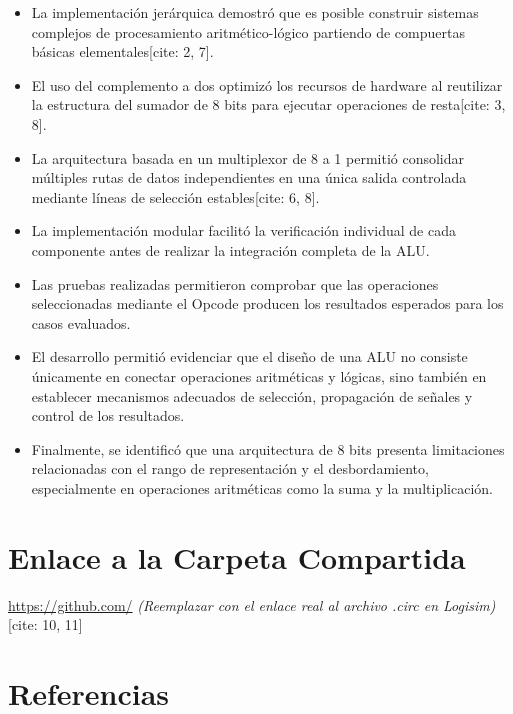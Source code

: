 \documentclass[12pt,a4paper]{article}
\begin{document}
\begin{itemize}
    \item La implementación jerárquica demostró que es posible construir sistemas complejos de procesamiento aritmético-lógico partiendo de compuertas básicas elementales[cite: 2, 7].
    
    \item El uso del complemento a dos optimizó los recursos de hardware al reutilizar la estructura del sumador de 8 bits para ejecutar operaciones de resta[cite: 3, 8].
    
    \item La arquitectura basada en un multiplexor de 8 a 1 permitió consolidar múltiples rutas de datos independientes en una única salida controlada mediante líneas de selección estables[cite: 6, 8].
    
    \item La implementación modular facilitó la verificación individual de cada componente antes de realizar la integración completa de la ALU.
    
    \item Las pruebas realizadas permitieron comprobar que las operaciones seleccionadas mediante el Opcode producen los resultados esperados para los casos evaluados.
    
    \item El desarrollo permitió evidenciar que el diseño de una ALU no consiste únicamente en conectar operaciones aritméticas y lógicas, sino también en establecer mecanismos adecuados de selección, propagación de señales y control de los resultados.
    
    \item Finalmente, se identificó que una arquitectura de 8 bits presenta limitaciones relacionadas con el rango de representación y el desbordamiento, especialmente en operaciones aritméticas como la suma y la multiplicación.
\end{itemize}

\section{Enlace a la Carpeta Compartida}

\url{https://github.com/} \textit{(Reemplazar con el enlace real al archivo .circ en Logisim)}[cite: 10, 11]

\section{Referencias}
\end{document}
